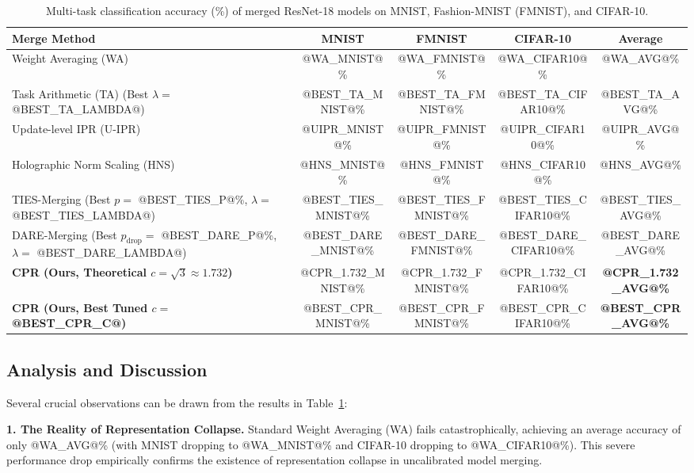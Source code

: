 \documentclass{article}
\theoremstyle{plain}
\theoremstyle{definition}
\theoremstyle{remark}
\begin{document}
\begin{table}[t]
\caption{Multi-task classification accuracy (\%) of merged ResNet-18 models on MNIST, Fashion-MNIST (FMNIST), and CIFAR-10.}
\label{table:merging_results}
\vskip 0.15in
\begin{center}
\begin{small}
\begin{tabular}{lcccc}
\toprule
Merge Method & MNIST & FMNIST & CIFAR-10 & Average \\
\midrule
Weight Averaging (WA) & @WA_MNIST@\% & @WA_FMNIST@\% & @WA_CIFAR10@\% & @WA_AVG@\% \\
Task Arithmetic (TA) (Best $\lambda = $ @BEST_TA_LAMBDA@) & @BEST_TA_MNIST@\% & @BEST_TA_FMNIST@\% & @BEST_TA_CIFAR10@\% & @BEST_TA_AVG@\% \\
Update-level IPR (U-IPR) & @UIPR_MNIST@\% & @UIPR_FMNIST@\% & @UIPR_CIFAR10@\% & @UIPR_AVG@\% \\
Holographic Norm Scaling (HNS) & @HNS_MNIST@\% & @HNS_FMNIST@\% & @HNS_CIFAR10@\% & @HNS_AVG@\% \\
TIES-Merging (Best $p = $ @BEST_TIES_P@\%, $\lambda = $ @BEST_TIES_LAMBDA@) & @BEST_TIES_MNIST@\% & @BEST_TIES_FMNIST@\% & @BEST_TIES_CIFAR10@\% & @BEST_TIES_AVG@\% \\
DARE-Merging (Best $p_{\text{drop}} = $ @BEST_DARE_P@\%, $\lambda = $ @BEST_DARE_LAMBDA@) & @BEST_DARE_MNIST@\% & @BEST_DARE_FMNIST@\% & @BEST_DARE_CIFAR10@\% & @BEST_DARE_AVG@\% \\
\midrule
\textbf{CPR (Ours, Theoretical $c = \sqrt{3} \approx 1.732$)} & @CPR_1.732_MNIST@\% & @CPR_1.732_FMNIST@\% & @CPR_1.732_CIFAR10@\% & \textbf{@CPR_1.732_AVG@\%} \\
\textbf{CPR (Ours, Best Tuned $c = $ @BEST_CPR_C@)} & @BEST_CPR_MNIST@\% & @BEST_CPR_FMNIST@\% & @BEST_CPR_CIFAR10@\% & \textbf{@BEST_CPR_AVG@\%} \\
\bottomrule
\end{tabular}
\end{small}
\end{center}
\vskip -0.1in
\end{table}

\subsection{Analysis and Discussion}

Several crucial observations can be drawn from the results in Table~\ref{table:merging_results}:

\textbf{1. The Reality of Representation Collapse.} Standard Weight Averaging (WA) fails catastrophically, achieving an average accuracy of only @WA_AVG@\% (with MNIST dropping to @WA_MNIST@\% and CIFAR-10 dropping to @WA_CIFAR10@\%). This severe performance drop empirically confirms the existence of representation collapse in uncalibrated model merging.
\end{document}
